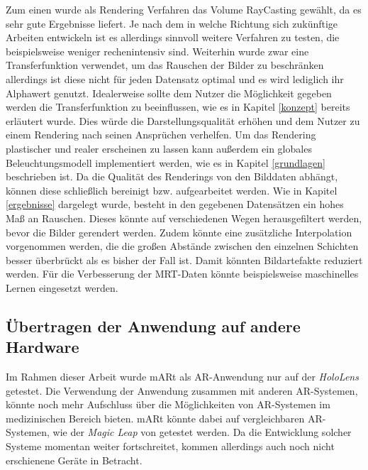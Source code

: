 Zum einen wurde als Rendering Verfahren das Volume RayCasting gewählt, da es sehr gute Ergebnisse liefert. Je nach dem in welche Richtung sich zukünftige Arbeiten entwickeln ist es allerdings sinnvoll weitere Verfahren zu testen, die beispielsweise weniger rechenintensiv sind. 
Weiterhin wurde zwar eine Transferfunktion verwendet, um das Rauschen der Bilder zu beschränken allerdings ist diese nicht für jeden Datensatz optimal und es wird lediglich ihr Alphawert genutzt. 
Idealerweise sollte dem Nutzer die Möglichkeit gegeben werden die Transferfunktion zu beeinflussen, wie es in Kapitel \ref{konzept} bereits erläutert wurde. Dies würde die Darstellungsqualität erhöhen und dem Nutzer zu einem Rendering nach seinen Ansprüchen verhelfen. 
Um das Rendering plastischer und realer erscheinen zu lassen kann außerdem ein globales Beleuchtungsmodell implementiert werden, wie es in Kapitel \ref{grundlagen} beschrieben ist. 
Da die Qualität des Renderings von den Bilddaten abhängt, können diese schließlich bereinigt bzw. aufgearbeitet werden. Wie in Kapitel \ref{ergebnisse} dargelegt wurde, besteht in den gegebenen Datensätzen ein hohes Maß an Rauschen. Dieses könnte auf verschiedenen Wegen herausgefiltert werden, bevor die Bilder gerendert werden. Zudem könnte eine zusätzliche Interpolation vorgenommen werden, die die großen Abstände zwischen den einzelnen Schichten besser überbrückt als es bisher der Fall ist. Damit könnten Bildartefakte reduziert werden. 
Für die Verbesserung der MRT-Daten könnte beispielsweise maschinelles Lernen eingesetzt werden.

\subsection{Übertragen der Anwendung auf andere Hardware}
\label{hololens2Fazit}

Im Rahmen dieser Arbeit wurde mARt als AR-Anwendung nur auf der \textit{HoloLens} getestet. 
Die Verwendung der Anwendung zusammen mit anderen AR-Systemen, könnte noch mehr Aufschluss über die Möglichkeiten von AR-Systemen im medizinischen Bereich bieten. 
mARt könnte dabei auf vergleichbaren AR-Systemen, wie der \textit{Magic Leap} von \cite{magicLeap} getestet werden.
Da die Entwicklung solcher Systeme momentan weiter fortschreitet, kommen allerdings auch noch nicht erschienene Geräte in Betracht.

